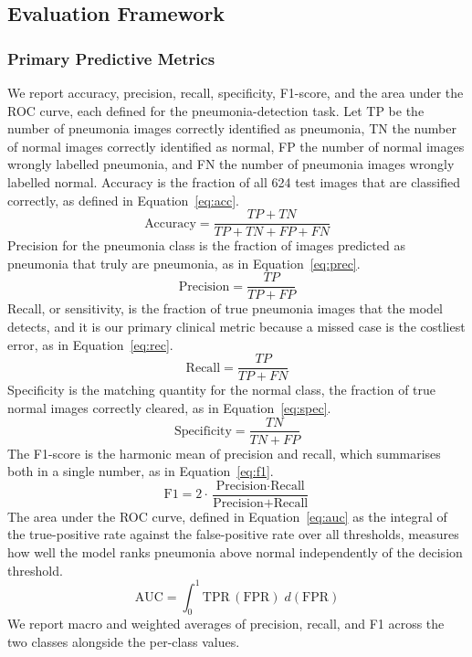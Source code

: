 \documentclass[preprint,12pt]{elsarticle}
\begin{document}
\subsection{Evaluation Framework}
\subsubsection{Primary Predictive Metrics}
We report accuracy, precision, recall, specificity, F1-score, and the area under the ROC curve, each defined for the pneumonia-detection task.
Let TP be the number of pneumonia images correctly identified as pneumonia, TN the number of normal images correctly identified as normal, FP the number of normal images wrongly labelled pneumonia, and FN the number of pneumonia images wrongly labelled normal.
Accuracy is the fraction of all 624 test images that are classified correctly, as defined in Equation~\ref{eq:acc}.
\begin{equation}
\text{Accuracy} = \frac{TP + TN}{TP + TN + FP + FN}
\label{eq:acc}
\end{equation}
Precision for the pneumonia class is the fraction of images predicted as pneumonia that truly are pneumonia, as in Equation~\ref{eq:prec}.
\begin{equation}
\text{Precision} = \frac{TP}{TP + FP}
\label{eq:prec}
\end{equation}
Recall, or sensitivity, is the fraction of true pneumonia images that the model detects, and it is our primary clinical metric because a missed case is the costliest error, as in Equation~\ref{eq:rec}.
\begin{equation}
\text{Recall} = \frac{TP}{TP + FN}
\label{eq:rec}
\end{equation}
Specificity is the matching quantity for the normal class, the fraction of true normal images correctly cleared, as in Equation~\ref{eq:spec}.
\begin{equation}
\text{Specificity} = \frac{TN}{TN + FP}
\label{eq:spec}
\end{equation}
The F1-score is the harmonic mean of precision and recall, which summarises both in a single number, as in Equation~\ref{eq:f1}.
\begin{equation}
\text{F1} = 2 \cdot \frac{\text{Precision} \cdot \text{Recall}}{\text{Precision} + \text{Recall}}
\label{eq:f1}
\end{equation}
The area under the ROC curve, defined in Equation~\ref{eq:auc} as the integral of the true-positive rate against the false-positive rate over all thresholds, measures how well the model ranks pneumonia above normal independently of the decision threshold.
\begin{equation}
\text{AUC} = \int_{0}^{1} \text{TPR}\,(\text{FPR})\; d(\text{FPR})
\label{eq:auc}
\end{equation}
We report macro and weighted averages of precision, recall, and F1 across the two classes alongside the per-class values.
\end{document}
